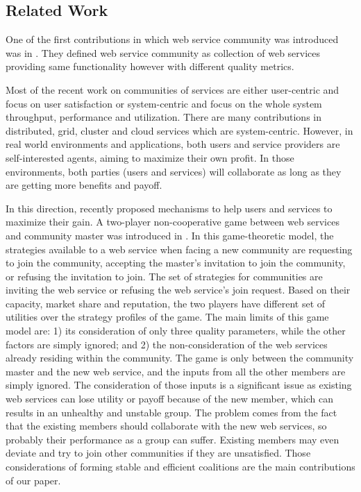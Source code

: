         \subsection{Related Work}\label{sec:BRRelatedWork}


One of the first contributions in which web service community was introduced was in \cite{Zeng:2003:QDW:775152.775211}. They defined web service community as collection of web services providing same functionality however with different quality metrics. 

Most of the recent work on communities of services are either
user-centric and focus on user satisfaction
\cite{Chun02user-centricperformance} or system-centric and focus
on the whole system throughput, performance and utilization. There
are many contributions in distributed, grid, cluster and cloud
services which are system-centric. However, in real world
environments and applications, both users and service providers
are self-interested agents, aiming to maximize their own profit.
In those environments, both parties (users and services) will
collaborate as long as they are getting more benefits and payoff.

In this direction, recently \cite{DBLP:conf/IEEEscc/LimTMB12,
DBLP:conf/IEEEscc/KhosravifarABT11, 10.1109/TSC.2012.12} proposed mechanisms to help
users and services to maximize their gain. A two-player
non-cooperative game between web services and community master was
introduced in \cite{DBLP:conf/IEEEscc/KhosravifarABT11}. In this
game-theoretic model, the strategies available to a web service
when facing a new community are requesting to join the community,
accepting the master's invitation to join the community, or
refusing the invitation to join. The set of strategies for
communities are inviting the web service or refusing the web
service's join request. Based on their capacity, market share and
reputation, the two players have different set of utilities over
the strategy profiles of the game. The main limits of this game
model are: 1) its consideration of only three quality parameters,
while the other factors are simply ignored; and 2) the
non-consideration of the web services already residing within the
community. The game is only between the community master and the
new web service, and the inputs from all the other members are
simply ignored. The consideration of those inputs is a significant
issue as existing web services can lose utility or payoff because
of the new member, which can results in an unhealthy and unstable
group. The problem comes from the fact that the existing members
should collaborate with the new web services, so probably their
performance as a group can suffer. Existing members may even
deviate and try to join other communities if they are unsatisfied.
Those considerations of forming stable and efficient coalitions
are the main contributions of our paper.

